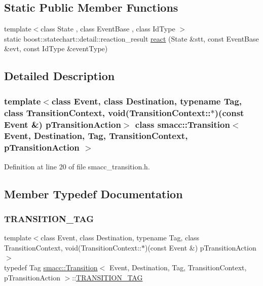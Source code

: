 \subsection*{Static Public Member Functions}
\begin{DoxyCompactItemize}
\item 
{\footnotesize template$<$class State , class Event\+Base , class Id\+Type $>$ }\\static boost\+::statechart\+::detail\+::reaction\+\_\+result \hyperlink{classsmacc_1_1Transition_a8399e8d49fa6f3ac72b06df0b2010932}{react} (State \&stt, const Event\+Base \&evt, const Id\+Type \&event\+Type)
\end{DoxyCompactItemize}


\subsection{Detailed Description}
\subsubsection*{template$<$class Event, class Destination, typename Tag, class Transition\+Context, void(\+Transition\+Context\+::$\ast$)(const Event \&) p\+Transition\+Action$>$\newline
class smacc\+::\+Transition$<$ Event, Destination, Tag, Transition\+Context, p\+Transition\+Action $>$}



Definition at line 20 of file smacc\+\_\+transition.\+h.



\subsection{Member Typedef Documentation}
\mbox{\label{classsmacc_1_1Transition_a672e883135344c4aea140381dd4d1c1d}} 
\subsubsection{\texorpdfstring{T\+R\+A\+N\+S\+I\+T\+I\+O\+N\+\_\+\+T\+AG}{TRANSITION\_TAG}}
{\footnotesize\ttfamily template$<$class Event, class Destination, typename Tag, class Transition\+Context, void(\+Transition\+Context\+::$\ast$)(const Event \&) p\+Transition\+Action$>$ \\
typedef Tag \hyperlink{classsmacc_1_1Transition}{smacc\+::\+Transition}$<$ Event, Destination, Tag, Transition\+Context, p\+Transition\+Action $>$\+::\hyperlink{classsmacc_1_1Transition_a672e883135344c4aea140381dd4d1c1d}{T\+R\+A\+N\+S\+I\+T\+I\+O\+N\+\_\+\+T\+AG}}




